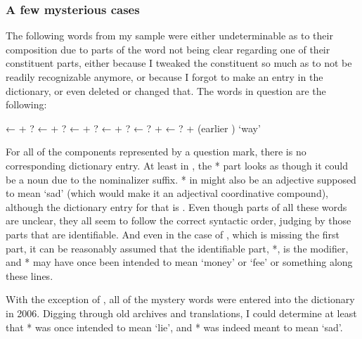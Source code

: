 
\subsubsection{A few mysterious cases}

The following words from my sample were either undeterminable as to their 
composition due to parts of the word not being clear regarding one of their 
constituent parts, either because I tweaked the constituent so much as to not 
be readily recognizable anymore, or because I forgot to make an entry in the 
dictionary, or even deleted or changed that. The words in question are the 
following:

\pex
	\a {}
		← 
		+ ?
	\a {}
		← 
		+ ?
	\a {}
		← 
		+ ?
	\a {}
		← 
		+ ?
	\a {}
		← ?
		+ 
	\a {}
		← ?
		+  (earlier ) `way'
\xe

For all of the components represented by a question mark, there is no 
corresponding dictionary entry. At least in , the 
* part looks as though it could be a noun due to the 
 nominalizer suffix. * in 
 might also be an adjective supposed to mean `sad' 
(which would make it an adjectival coordinative compound), although the 
dictionary entry for that is . Even though parts of all 
these words are unclear, they all seem to follow the correct syntactic order, 
judging by those parts that are identifiable. And even in the case of 
, which is missing the first part, it can be 
reasonably assumed that the identifiable part, *, is the 
modifier, and * may have once been intended to mean `money' 
or `fee' or something along these lines.

With the exception of , all of the mystery words 
were entered into the dictionary in 2006. Digging through old archives and 
translations, I could determine at least that * was once 
intended to mean `lie', and * was indeed meant to 
mean `sad'.

